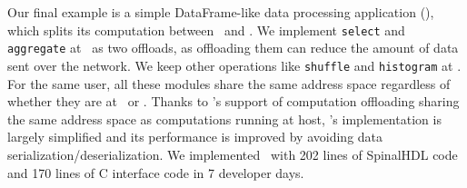 Our final example is a simple DataFrame-like data processing application ({\em \sysdf}),
which splits its computation between \CN\ and \MN.
We implement \texttt{select} and \texttt{aggregate} at \MN\ as two offloads,
as offloading them can reduce the amount of data sent over the network.
We keep other operations like \texttt{shuffle} and \texttt{histogram} at \CN.
For the same user, all these modules share the same address space regardless of whether they are at \CN\ or \MN.
Thanks to \sys's support of computation offloading sharing the same address space as computations running at host, \sysdf's implementation is largely simplified and its performance is improved by avoiding data serialization/deserialization.
We implemented \sysdf\ with 202 lines of SpinalHDL code and 170 lines of C interface code in 7 developer days.

